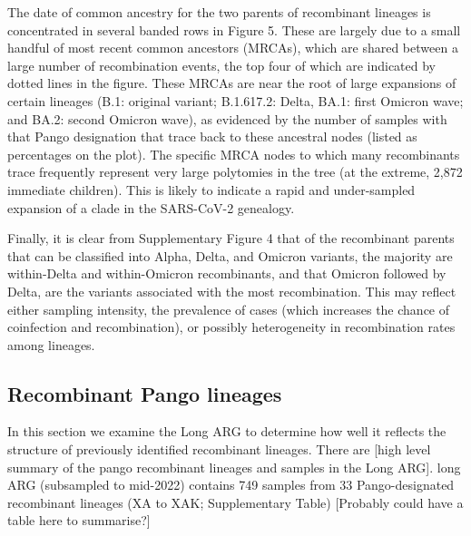 \documentclass{article}
\begin{document}
The date of common ancestry for the two parents of recombinant lineages is
concentrated in several banded rows in Figure 5. These are largely due to a
small handful of most recent common ancestors (MRCAs), which are shared between
a large number of recombination events, the top four of which are indicated by
dotted lines in the figure. These MRCAs are near the root of large expansions
of certain lineages (B.1: original variant;  B.1.617.2: Delta, BA.1: first
Omicron wave; and BA.2: second Omicron wave), as evidenced by the number of
samples with that Pango designation that trace back to these ancestral nodes
(listed as percentages on the plot). The specific MRCA nodes to which many
recombinants trace frequently represent very large polytomies in the tree (at
the extreme, 2,872 immediate children). This is likely to indicate a rapid and
under-sampled expansion of a clade in the SARS-CoV-2 genealogy.

Finally, it is clear from Supplementary Figure 4 that of the recombinant
parents that can be classified into Alpha, Delta, and Omicron variants, the
majority are within-Delta and within-Omicron recombinants, and that Omicron
followed by Delta, are the variants associated with the most recombination.
This may reflect either sampling intensity, the prevalence of cases (which
increases the chance of coinfection and recombination), or possibly
heterogeneity in recombination rates among lineages.

\subsection{Recombinant Pango lineages}

In this section we examine the Long ARG to determine how well it reflects
the structure of previously identified recombinant lineages.
There are [high level summary of the pango recombinant lineages and samples
in the Long ARG].
long ARG (subsampled to mid-2022) contains 749 samples
from 33 Pango-designated recombinant lineages (XA to XAK; Supplementary Table)
[Probably could have a table here to summarise?]

\end{document}
